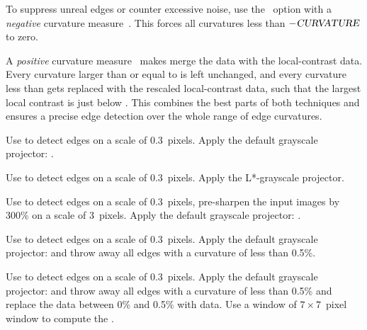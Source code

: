 To suppress unreal edges or counter excessive noise, use the ~option with a \emph{negative} curvature measure~.  This forces
all curvatures less than $-\textsl{CURVATURE}$ to zero.

A \emph{positive} curvature measure~ makes \App{} merge the 
data with the local-contrast data.  Every curvature larger than or equal to 
is left unchanged, and every curvature less than  gets replaced with the
rescaled local-contrast data, such that the largest local contrast is just below
.  This combines the best parts of both techniques and ensures a precise edge
detection over the whole range of edge curvatures.

\noindent{}

\begin{codelist}
\item[\option{--contrast-edge-scale=0.3}]\itemend
  Use  to detect edges on a scale of 0.3~pixels.  Apply the default grayscale
  projector: .

\item[\itempar{\option{--contrast-edge-scale=0.3} \option{--gray-projector=l-star}}]\itemend
  Use  to detect edges on a scale of 0.3~pixels.  Apply the L*-grayscale projector.

\item[\option{--contrast-edge-scale=0.3:3:300\%}]\itemend
  Use  to detect edges on a scale of 0.3~pixels, pre-sharpen the input images by
  300\% on a scale of 3~pixels.  Apply the default grayscale projector: .

\item[\itempar{\option{--contrast-edge-scale=0.3}
    \mbox{\option{--contrast-min-curvature=-0.5\%}}}]\itemend
  Use  to detect edges on a scale of 0.3~pixels.  Apply the default grayscale
  projector:  and throw away all edges with a curvature of less than 0.5\%.

\item[\itempar{\mbox{\option{--contrast-edge-scale=0.3}}
    \mbox{\option{--contrast-min-curvature=0.5\%}}
    \mbox{\option{--contrast-window-size=7}}}]\itemend
  Use  to detect edges on a scale of 0.3~pixels.  Apply the default grayscale
  projector:  and throw away all edges with a curvature of less than 0.5\% and
  replace the  data between 0\% and 0.5\% with  data.  Use a window
  of $7 \times 7$~pixel window to compute the .
\end{codelist}


